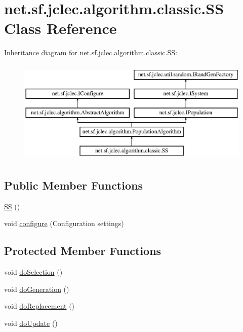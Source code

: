 \hypertarget{classnet_1_1sf_1_1jclec_1_1algorithm_1_1classic_1_1_s_s}{\section{net.\-sf.\-jclec.\-algorithm.\-classic.\-S\-S Class Reference}
\label{classnet_1_1sf_1_1jclec_1_1algorithm_1_1classic_1_1_s_s}
}
Inheritance diagram for net.\-sf.\-jclec.\-algorithm.\-classic.\-S\-S\-:\begin{figure}[H]
\begin{center}
\leavevmode
\includegraphics[height=5.000000cm]{classnet_1_1sf_1_1jclec_1_1algorithm_1_1classic_1_1_s_s}
\end{center}
\end{figure}
\subsection*{Public Member Functions}
\begin{DoxyCompactItemize}
\item 
\hyperlink{classnet_1_1sf_1_1jclec_1_1algorithm_1_1classic_1_1_s_s_a59bb4e37a66221172b99fe089cca3e32}{S\-S} ()
\item 
void \hyperlink{classnet_1_1sf_1_1jclec_1_1algorithm_1_1classic_1_1_s_s_a750a21e7d053bcd7170c15b1eff98443}{configure} (Configuration settings)
\end{DoxyCompactItemize}
\subsection*{Protected Member Functions}
\begin{DoxyCompactItemize}
\item 
void \hyperlink{classnet_1_1sf_1_1jclec_1_1algorithm_1_1classic_1_1_s_s_a17a4da3091ee68f6bdaaddd7e1b87d88}{do\-Selection} ()
\item 
void \hyperlink{classnet_1_1sf_1_1jclec_1_1algorithm_1_1classic_1_1_s_s_a7ced791d9ff0dc80a04645438a2611cb}{do\-Generation} ()
\item 
void \hyperlink{classnet_1_1sf_1_1jclec_1_1algorithm_1_1classic_1_1_s_s_ac8ec51f491f032e8cb1140ef0da43f51}{do\-Replacement} ()
\item 
void \hyperlink{classnet_1_1sf_1_1jclec_1_1algorithm_1_1classic_1_1_s_s_abb8fcd2389cc3909a55b6a33f6fe946d}{do\-Update} ()
\end{DoxyCompactItemize}
